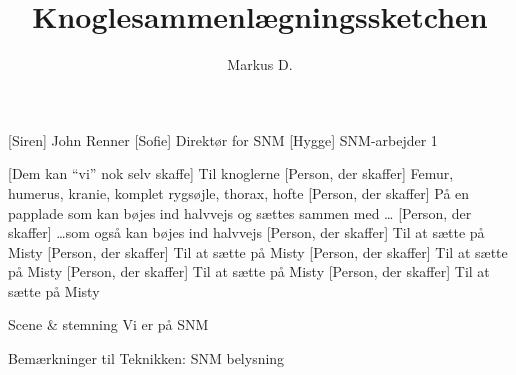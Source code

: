 \documentclass[a4paper,11pt]{article}
\title{Knoglesammenlægningssketchen}
\author{Markus D.}
\begin{document}
\maketitle

\begin{roles}
    [Siren] John Renner
    [Sofie] Direktør for SNM
    [Hygge] SNM-arbejder 1
\end{roles}

\begin{props}
    [Dem kan ``vi'' nok selv skaffe] Til knoglerne
    [Person, der skaffer] Femur, humerus, kranie, komplet rygsøjle, thorax, hofte
    [Person, der skaffer] På en papplade som kan bøjes ind halvvejs og sættes sammen med \ldots
    [Person, der skaffer] \ldots som også kan bøjes ind halvvejs
    [Person, der skaffer] Til at sætte på Misty
    [Person, der skaffer] Til at sætte på Misty
    [Person, der skaffer] Til at sætte på Misty
    [Person, der skaffer] Til at sætte på Misty
    [Person, der skaffer] Til at sætte på Misty
\end{props}

\scene
Scene \& stemning
Vi er på SNM

Bemærkninger til Teknikken:
SNM belysning
\end{document}
